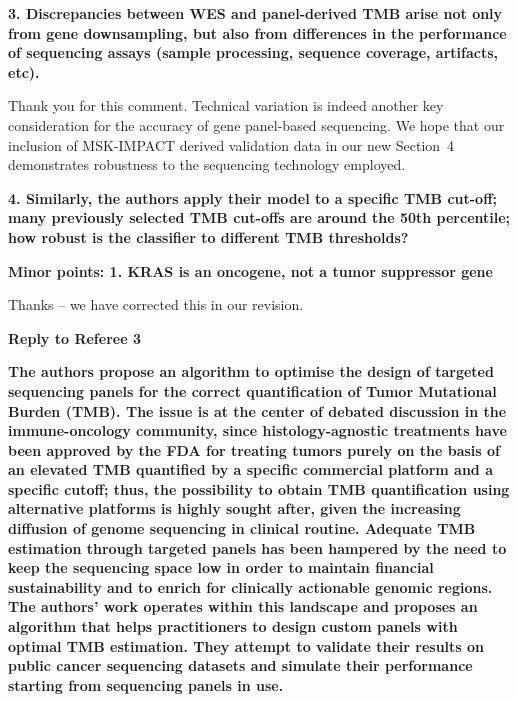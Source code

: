 \documentclass[12pt]{article}
\begin{document}
\textbf{3. Discrepancies between WES and panel-derived TMB arise not only from gene downsampling, but also from differences in the performance of sequencing assays (sample processing, sequence coverage, artifacts, etc).}

Thank you for this comment. Technical variation is indeed another key consideration for the accuracy of gene panel-based sequencing. We hope that our inclusion of MSK-IMPACT derived validation data in our new Section~4 demonstrates robustness to the sequencing technology employed. 

\textbf{4. Similarly, the authors apply their model to a specific TMB cut-off; many previously selected TMB cut-offs are around the 50th percentile; how robust is the classifier to different TMB thresholds?}


\textbf{Minor points: 1. KRAS is an oncogene, not a tumor suppressor gene}

Thanks -- we have corrected this in our revision. 

\begin{thebibliography}{75}

\end{thebibliography}

\clearpage

{\large \textbf{Reply to Referee 3}}

\textbf{The authors propose an algorithm to optimise the design of targeted sequencing panels for the correct quantification of Tumor Mutational Burden (TMB). The issue is at the center of debated discussion in the immune-oncology community, since histology-agnostic treatments have been approved by the FDA for treating tumors purely on the basis of an elevated TMB quantified by a specific commercial platform and a specific cutoff; thus, the possibility to obtain TMB quantification using alternative platforms is highly sought after, given the increasing diffusion of genome sequencing in clinical routine. Adequate TMB estimation through targeted panels has been hampered by the need to keep the sequencing space low in order to maintain financial sustainability and to enrich for clinically actionable genomic regions. The authors’ work operates within this landscape and proposes an algorithm that helps practitioners to design custom panels with optimal TMB estimation. They attempt to
validate their results on public cancer sequencing datasets and simulate their performance starting from sequencing panels in use.}
\end{document}
